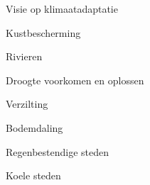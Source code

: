 
\begin{voorstel}{Visie op klimaatadaptatie}\end{voorstel}

\begin{voorstel}{Kustbescherming}\end{voorstel}
\begin{voorstel}{Rivieren}\end{voorstel}
\begin{voorstel}{Droogte voorkomen en oplossen}\end{voorstel}
\begin{voorstel}{Verzilting}\end{voorstel}
\begin{voorstel}{Bodemdaling}\end{voorstel}
\begin{voorstel}{Regenbestendige steden}\end{voorstel}
\begin{voorstel}{Koele steden}\end{voorstel}
